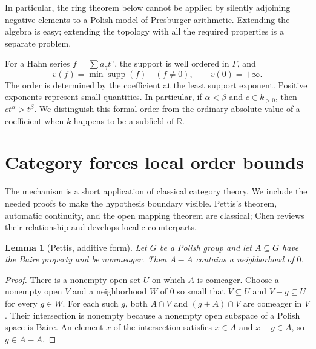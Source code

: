 \documentclass[11pt]{article}
\numberwithin{equation}{section}
\newtheorem{lemma}[lemma]{Lemma}
\theoremstyle{definition}
\theoremstyle{remark}
\newcommand{\R}{\mathbb R}
\newcommand{\supp}{\operatorname{supp}}
\begin{document}
In particular, the ring theorem below cannot be applied by silently adjoining
negative elements to a Polish model of Presburger arithmetic. Extending the
algebra is easy; extending the topology with all the required properties is a
separate problem.

For a Hahn series $f=\sum a_\gamma t^\gamma$, the support is well ordered in
$\Gamma$, and
\[
 v(f)=\min\supp(f)\quad(f\ne0),\qquad v(0)=+\infty.
\]
The order is determined by the coefficient at the least support exponent.
Positive exponents represent small quantities. In particular, if
$\alpha<\beta$ and $c\in k_{>0}$, then $ct^\alpha>t^\beta$.
We distinguish this formal order from the ordinary absolute value of a
coefficient when $k$ happens to be a subfield of $\R$.

\section{Category forces local order bounds}
\label{pma:ser:sec:category}

The mechanism is a short application of classical category theory. We include
the needed proofs to make the hypothesis boundary visible. Pettis's theorem,
automatic continuity, and the open mapping theorem are classical; Chen
\cite{Chen} reviews their relationship and develops localic counterparts.

\begin{lemma}[Pettis, additive form]\label{pma:ser:lem:pettis}
Let $G$ be a Polish group and let $A\subseteq G$ have the Baire property and be
nonmeager. Then $A-A$ contains a neighborhood of $0$.
\end{lemma}
\begin{proof}
There is a nonempty open set $U$ on which $A$ is comeager. Choose a nonempty
open $V$ and a neighborhood $W$ of $0$ so small that $V\subseteq U$ and
$V-g\subseteq U$ for every $g\in W$. For each such $g$, both $A\cap V$ and
$(g+A)\cap V$ are comeager in $V$. Their intersection is nonempty because a
nonempty open subspace of a Polish space is Baire. An element $x$ of the
intersection satisfies $x\in A$ and $x-g\in A$, so $g\in A-A$.
\end{proof}
\end{document}
